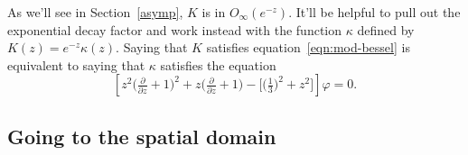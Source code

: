 \documentclass{article}
\theoremstyle{definition}
\theoremstyle{plain}
\begin{document}
As we'll see in Section~\ref{asymp}, $K$ is in $O_\infty(e^{-z})$. It'll be helpful to pull out the exponential decay factor and work instead with the function $\kappa$ defined by $K(z) = e^{-z} \kappa(z)$. Saying that $K$ satisfies equation~\ref{eqn:mod-bessel} is equivalent to saying that $\kappa$ satisfies the equation
\begin{equation}\label{eqn:shifted-mod-bessel}
\left[z^2 \big(\tfrac{\partial}{\partial z} + 1\big)^2 + z \big(\tfrac{\partial}{\partial z} + 1\big) - \big[\big(\tfrac{1}{3}\big)^2 + z^2\big]\right] \varphi = 0.
\end{equation}
\subsection{Going to the spatial domain}
\end{document}
